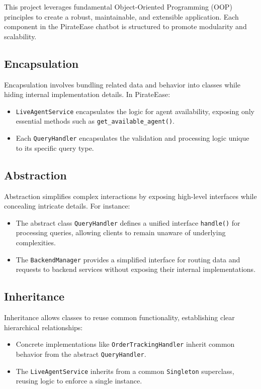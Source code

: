 \documentclass[11pt]{article}
\begin{document}
This project leverages fundamental Object-Oriented Programming (OOP) principles to create a robust, maintainable, and extensible application. Each component in the PirateEase chatbot is structured to promote modularity and scalability.
\subsection{Encapsulation}



Encapsulation involves bundling related data and behavior into classes while hiding internal implementation details. In PirateEase:
\begin{itemize}
	\item \texttt{LiveAgentService} encapsulates the logic for agent availability, exposing only essential methods such as \texttt{get\_available\_agent()}.

    \item Each \texttt{QueryHandler} encapsulates the validation and processing logic unique to its specific query type.
\end{itemize}



\subsection{Abstraction}



Abstraction simplifies complex interactions by exposing high-level interfaces while concealing intricate details. For instance:
\begin{itemize}
    \item The abstract class \texttt{QueryHandler} defines a unified interface \texttt{handle()} for processing queries, allowing clients to remain unaware of underlying complexities.

    \item The \texttt{BackendManager} provides a simplified interface for routing data and requests to backend services without exposing their internal implementations.
\end{itemize}



\subsection{Inheritance}



Inheritance allows classes to reuse common functionality, establishing clear hierarchical relationships:
\begin{itemize}
    \item Concrete implementations like \texttt{OrderTrackingHandler} inherit common behavior from the abstract \texttt{QueryHandler}.

    \item The \texttt{LiveAgentService} inherits from a common \texttt{Singleton} superclass, reusing logic to enforce a single instance.
\end{itemize}
\end{document}
